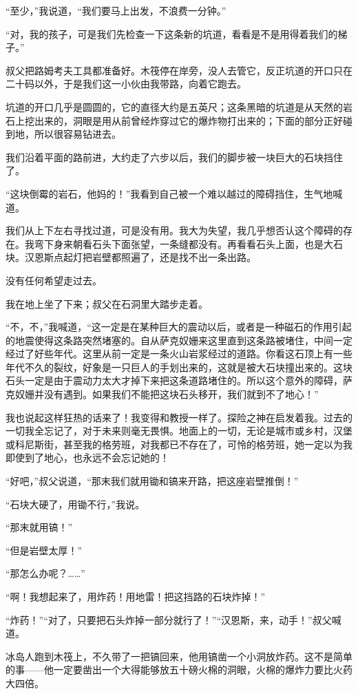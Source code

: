\documentclass[10pt]{book}
\begin{document}
“至少，”我说道，“我们要马上出发，不浪费一分钟。”

“对，我的孩子，可是我们先检查一下这条新的坑道，看看是不是用得着我们的梯子。”

叔父把路姆考夫工具都准备好。木筏停在岸旁，没人去管它，反正坑道的开口只在二十码以外，于是我们这一小伙由我带路，向着它跑去。

坑道的开口几乎是圆圆的，它的直径大约是五英尺；这条黑暗的坑道是从天然的岩石上挖出来的，洞眼是用从前曾经炸穿过它的爆炸物打出来的；下面的部分正好碰到地，所以很容易钻进去。

我们沿着平面的路前进，大约走了六步以后，我们的脚步被一块巨大的石块挡住了。

“这块倒霉的岩石，他妈的！”我看到自己被一个难以越过的障碍挡住，生气地喊道。

我们从上下左右寻找过道，可是没有用。我大为失望，我几乎想否认这个障碍的存在。我弯下身来朝看石头下面张望，一条缝都没有。再看看石头上面，也是大石块。汉恩斯点起灯把岩壁都照遍了，还是找不出一条出路。

没有任何希望走过去。

我在地上坐了下来；叔父在石洞里大踏步走着。

“不，不，”我喊道，“这一定是在某种巨大的震动以后，或者是一种磁石的作用引起的地震使得这条路突然堵塞的。自从萨克奴姗来这里直到这条路被堵住，中间一定经过了好些年代。这里从前一定是一条火山岩浆经过的道路。你看这石顶上有一些年代不久的裂纹，好象是一只巨人的手划出来的，这就是被大石块撞出来的。这块石头一定是由于震动力太大才掉下来把这条道路堵住的。所以这个意外的障碍，萨克奴姗并没有遇到。如果我们不能把这块石头移开，我们就到不了地心！”

我也说起这样狂热的话来了！我变得和教授一样了。探险之神在启发着我。过去的一切我全忘记了，对于未来则毫无畏惧。地面上的一切，无论是城市或乡村，汉堡或科尼斯街，甚至我的格劳班，对我都已不存在了，可怜的格劳班，她一定以为我即使到了地心，也永远不会忘记她的！

“好吧，”叔父说道，“那末我们就用锄和镐来开路，把这座岩壁推倒！”

“石块大硬了，用锄不行，”我说。

“那末就用镐！”

“但是岩壁太厚！”

“那怎么办呢？……”

“啊！我想起来了，用炸药！用地雷！把这挡路的石块炸掉！”

“炸药！”“对了，只要把石头炸掉一部分就行了！”“汉恩斯，来，动手！”叔父喊道。

冰岛人跑到木筏上，不久带了一把镐回来，他用镐凿一个小洞放炸药。这不是简单的事——他一定要凿出一个大得能够放五十磅火棉的洞眼，火棉的爆炸力要比火药大四倍。
\end{document}
